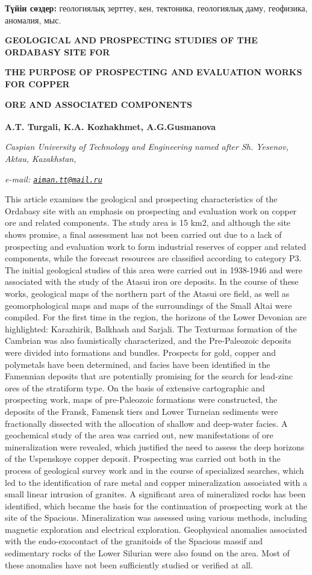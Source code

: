 {\bfseries Түйін сөздер:} геологиялық зерттеу, кен, тектоника, геологиялық
даму, геофизика, аномалия, мыс.

{\bfseries GEOLOGICAL AND PROSPECTING STUDIES OF THE ORDABASY SITE FOR}

{\bfseries THE PURPOSE OF PROSPECTING AND EVALUATION WORKS FOR COPPER}

{\bfseries ORE AND ASSOCIATED COMPONENTS}

{\bfseries A.T. Turgali\textsuperscript{\envelope }, K.A. Kozhakhmet, A.G.Gusmanova}

\emph{Caspian University of Technology and Engineering named after Sh.
Yesenov, Aktau, Kazakhstan,}

\emph{e-mail:
\href{mailto:aiman.tt@mail.ru}{\nolinkurl{aiman.tt@mail.ru}}}

This article examines the geological and prospecting characteristics of
the Ordabasy site with an emphasis on prospecting and evaluation work on
copper ore and related components. The study area is 15 km2, and
although the site shows promise, a final assessment has not been carried
out due to a lack of prospecting and evaluation work to form industrial
reserves of copper and related components, while the forecast resources
are classified according to category P3. The initial geological studies
of this area were carried out in 1938-1946 and were associated with the
study of the Atasui iron ore deposits. In the course of these works,
geological maps of the northern part of the Atasui ore field, as well as
geomorphological maps and maps of the surroundings of the Small Altai
were compiled. For the first time in the region, the horizons of the
Lower Devonian are highlighted: Karazhirik, Balkhash and Sarjali. The
Texturmas formation of the Cambrian was also faunistically
characterized, and the Pre-Paleozoic deposits were divided into
formations and bundles. Prospects for gold, copper and polymetals have
been determined, and facies have been identified in the Famennian
deposits that are potentially promising for the search for lead-zinc
ores of the stratiform type. On the basis of extensive cartographic and
prospecting work, maps of pre-Paleozoic formations were constructed, the
deposits of the Fransk, Famensk tiers and Lower Turneian sediments were
fractionally dissected with the allocation of shallow and deep-water
facies. A geochemical study of the area was carried out, new
manifestations of ore mineralization were revealed, which justified the
need to assess the deep horizons of the Uspenskoye copper deposit.
Prospecting was carried out both in the process of geological survey
work and in the course of specialized searches, which led to the
identification of rare metal and copper mineralization associated with a
small linear intrusion of granites. A significant area of mineralized
rocks has been identified, which became the basis for the continuation
of prospecting work at the site of the Spacious. Mineralization was
assessed using various methods, including magnetic exploration and
electrical exploration. Geophysical anomalies associated with the
endo-exocontact of the granitoids of the Spacious massif and sedimentary
rocks of the Lower Silurian were also found on the area. Most of these
anomalies have not been sufficiently studied or verified at all.

